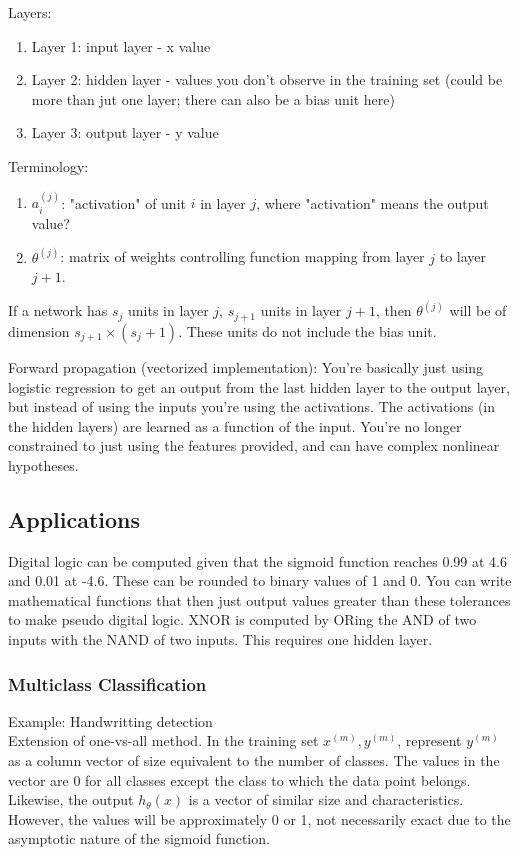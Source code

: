 \documentclass[11pt,letterpaper]{article}
\begin{document}
Layers:
\begin{enumerate}
	\item Layer 1: input layer - x value
	\item Layer 2: hidden layer - values you don't observe in the training set (could be more than jut one layer; there can also be a bias unit here)
	\item Layer 3: output layer - y value
\end{enumerate}

Terminology:
\begin{enumerate}
	\item $a_i^{(j)}$: "activation" of unit $i$ in layer $j$, where "activation" means the output value?
	\item $\theta^{(j)}$: matrix of weights controlling function mapping from layer $j$ to layer $j+1$.
\end{enumerate}

If a network has $s_j$ units in layer $j$, $s_{j+1}$ units in layer $j+1$, then $\theta^{(j)}$ will be of dimension $s_{j+1} \times (s_j + 1).$ These units do not include the bias unit.

Forward propagation (vectorized implementation): You're basically just using logistic regression to get an output from the last hidden layer to the output layer, but instead of using the inputs you're using the activations. The activations (in the hidden layers) are learned as a function of the input. You're no longer constrained to just using the features provided, and can have complex nonlinear hypotheses.

\subsection{Applications}
Digital logic can be computed given that the sigmoid function reaches 0.99 at 4.6 and 0.01 at -4.6. These can be rounded to binary values of 1 and 0. You can write mathematical functions that then just output values greater than these tolerances to make pseudo digital logic. XNOR is computed by ORing the AND of two inputs with the NAND of two inputs. This requires one hidden layer.

\subsubsection{Multiclass Classification}
Example: Handwritting detection\\
Extension of one-vs-all method. In the training set $x^{(m)}, y^{(m)}$, represent $y^{(m)}$ as a column vector of size equivalent to the number of classes. The values in the vector are 0 for all classes except the class to which the data point belongs. Likewise, the output $h_\theta (x)$ is a vector of similar size and characteristics. However, the values will be approximately 0 or 1, not necessarily exact due to the asymptotic nature of the sigmoid function.
\end{document}
